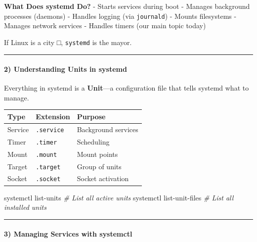 \documentclass[
  english,
  paper=a4,
  oneside  ,captions=tableheading
]{scrartcl}
\newenvironment{Shaded}{}{}
\newcommand{\CommentTok}[1]{\textcolor[rgb]{0.38,0.63,0.69}{\textit{#1}}}
\newcommand{\ExtensionTok}[1]{#1}
\newcommand{\NormalTok}[1]{#1}
\newcounter{none} %
\renewenvironment{quote}{\begin{customblockquote}\list{}{\rightmargin=0em\leftmargin=0em}%
\item\relax\color{blockquote-text}\ignorespaces}{\unskip\unskip\endlist\end{customblockquote}}
\begin{document}
\textbf{What Does systemd Do?} - Starts services during boot - Manages
background processes (daemons) - Handles logging (via \texttt{journald})
- Mounts filesystems - Manages network services - Handles timers (our
main topic today)

\begin{quote}
If Linux is a city □, \texttt{systemd} is the mayor.
\end{quote}

\begin{center}\rule{0.5\linewidth}{0.5pt}\end{center}

\paragraph{2) Understanding Units in
systemd}\label{understanding-units-in-systemd}

Everything in systemd is a \textbf{Unit}---a configuration file that
tells systemd what to manage.

{\def\LTcaptype{none} %
\begin{longtable}[]{@{}lll@{}}
\toprule\noalign{}
Type & Extension & Purpose \\
\midrule\noalign{}
\endhead
\bottomrule\noalign{}
\endlastfoot
Service & \texttt{.service} & Background services \\
Timer & \texttt{.timer} & Scheduling \\
Mount & \texttt{.mount} & Mount points \\
Target & \texttt{.target} & Group of units \\
Socket & \texttt{.socket} & Socket activation \\
\end{longtable}
}

\begin{Shaded}
\begin{Highlighting}[]
\ExtensionTok{systemctl}\NormalTok{ list{-}units           }\CommentTok{\# List all active units}
\ExtensionTok{systemctl}\NormalTok{ list{-}unit{-}files      }\CommentTok{\# List all installed units}
\end{Highlighting}
\end{Shaded}

\begin{center}\rule{0.5\linewidth}{0.5pt}\end{center}

\paragraph{3) Managing Services with
systemctl}\label{managing-services-with-systemctl}
\end{document}

